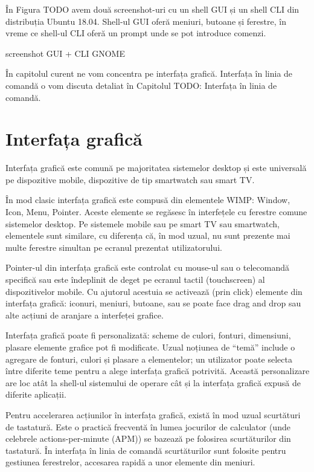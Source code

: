 În Figura TODO avem două screenshot-uri cu un shell GUI și un shell CLI din distribuția Ubuntu 18.04. Shell-ul GUI oferă meniuri, butoane și ferestre, în vreme ce shell-ul CLI oferă un prompt unde se pot introduce comenzi.

screenshot GUI + CLI GNOME

În capitolul curent ne vom concentra pe interfața grafică. Interfața în linia de comandă o vom discuta detaliat în Capitolul TODO: Interfața în linia de comandă.

\section{Interfața grafică}
\label{sec:ui:gui}

Interfața grafică este comună pe majoritatea sistemelor desktop și este universală pe dispozitive mobile, dispozitive de tip smartwatch sau smart TV.

În mod clasic interfața grafică este compusă din elementele WIMP: Window, Icon, Menu, Pointer. Aceste elemente se regăsesc în interfețele cu ferestre comune sistemelor desktop. Pe sistemele mobile sau pe smart TV sau smartwatch, elementele sunt similare, cu diferența că, în mod uzual, nu sunt prezente mai multe ferestre simultan pe ecranul prezentat utilizatorului.

Pointer-ul din interfața grafică este controlat cu mouse-ul sau o telecomandă specifică sau este îndeplinit de deget pe ecranul tactil (touchscreen) al dispozitivelor mobile. Cu ajutorul acestuia se activează (prin click) elemente din interfața grafică: iconuri, meniuri, butoane, sau se poate face drag and drop sau alte acțiuni de aranjare a interfeței grafice.

Interfața grafică poate fi personalizată: scheme de culori, fonturi, dimensiuni, plasare elemente grafice pot fi modificate. Uzual noțiunea de “temă” include o agregare de fonturi, culori și plasare a elementelor; un utilizator poate selecta între diferite teme pentru a alege interfața grafică potrivită. Această personalizare are loc atât la shell-ul sistemului de operare cât și la interfața grafică expusă de diferite aplicații.

Pentru accelerarea acțiunilor în interfața grafică, există în mod uzual scurtături de tastatură. Este o practică frecventă în lumea jocurilor de calculator (unde celebrele actions-per-minute (APM)) se bazează pe folosirea scurtăturilor din tastatură. În interfața în linia de comandă scurtăturilor sunt folosite pentru gestiunea ferestrelor, accesarea rapidă a unor elemente din meniuri.

